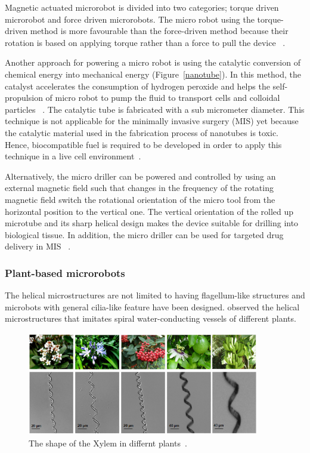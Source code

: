 \documentclass[12pt,a4paper,titlepage]{report}
\newcommand{\hilight}[1]{\colorbox{yellow}{#1}}
\begin{document}
Magnetic actuated microrobot is divided into two categories; torque driven microrobot and force
 driven microrobots.
The micro robot using the torque-driven method is more favourable than the force-driven method 
because their rotation is based on applying torque rather than a force to pull the device ~\citep{peyer2013bacteria}.



Another approach for powering a micro robot is using the catalytic conversion of chemical energy
 into mechanical energy (Figure~\ref{nanotube}). In this method, the catalyst accelerates the consumption of hydrogen peroxide
 and helps the self-propulsion of micro robot to pump the fluid to transport cells and colloidal 
particles ~\citep{C2NR32798H}. The catalytic tube is fabricated with a sub micrometer diameter.
 This technique is not applicable for the minimally invasive surgery (MIS) yet because the catalytic
 material used in the fabrication process of nanotubes is toxic. Hence, biocompatible fuel is required to be developed in order to 
apply this technique in a live cell environment~\citep{C2NR32798H}.




Alternatively, the micro driller can be powered and controlled by using an external magnetic field 
such that changes in the frequency of the rotating magnetic field switch the rotational orientation of the 
micro tool from the horizontal position to the vertical one. The vertical orientation of the rolled up microtube 
and its sharp helical design makes the device suitable for drilling into biological tissue. In addition, the micro 
driller can be used for targeted drug delivery in MIS ~\citep{C2NR32798H}. 


\subsubsection{Plant-based microrobots}
The helical microstructures are not limited to having flagellum-like structures and microbots with
general cilia-like feature have been designed. \citeauthor{gao2013bioinspired}
 observed the helical microstructures that imitates spiral water-conducting vessels of different plants. 

\begin{figure}
  \centering
    \includegraphics[width=0.9\textwidth]{plants}
  \caption[Xylem\rq{}s shape in different plants ]{The shape of the Xylem in differnt plants~\citep{mahoney2011velocity}.}
  \label{plants}
\end{figure}
\end{document}
